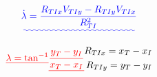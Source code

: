 \documentclass[conference]{IEEEtran}
\providecommand{\DIFadd}[1]{{\protect\color{blue}\uwave{#1}}} %
\providecommand{\DIFdel}[1]{{\protect\color{red}\sout{#1}}}                      %
\providecommand{\DIFaddbegin}{} %
\providecommand{\DIFaddend}{} %
\providecommand{\DIFdelbegin}{} %
\providecommand{\DIFdelend}{} %
\newcommand{\DIFscaledelfig}{0.5}
\newlength{\DIFdelgraphicswidth} %
\newlength{\DIFdelgraphicsheight} %
\newcommand{\DIFaddincludegraphics}[2][]{{\color{blue}\fbox{\DIFOincludegraphics[#1]{#2}}}} %
\newcommand{\DIFdelincludegraphics}[2][]{%
\sbox{\DIFdelgraphicsbox}{\DIFOincludegraphics[#1]{#2}}%
\settoboxwidth{\DIFdelgraphicswidth}{\DIFdelgraphicsbox} %
\settoboxtotalheight{\DIFdelgraphicsheight}{\DIFdelgraphicsbox} %
\scalebox{\DIFscaledelfig}{%
\parbox[b]{\DIFdelgraphicswidth}{\usebox{\DIFdelgraphicsbox}\\[-\baselineskip] \rule{\DIFdelgraphicswidth}{0em}}\llap{\resizebox{\DIFdelgraphicswidth}{\DIFdelgraphicsheight}{%
\setlength{\unitlength}{\DIFdelgraphicswidth}%
\begin{picture}(1,1)%
\thicklines\linethickness{2pt} %
{\color[rgb]{1,0,0}\put(0,0){\framebox(1,1){}}}%
{\color[rgb]{1,0,0}\put(0,0){\line( 1,1){1}}}%
{\color[rgb]{1,0,0}\put(0,1){\line(1,-1){1}}}%
\end{picture}%
}\hspace*{3pt}}} %
} %
\DeclareRobustCommand{\DIFaddbegin}{\DIFOaddbegin \let\includegraphics\DIFaddincludegraphics} %
\DeclareRobustCommand{\DIFaddend}{\DIFOaddend \let\includegraphics\DIFOincludegraphics} %
\DeclareRobustCommand{\DIFdelbegin}{\DIFOdelbegin \let\includegraphics\DIFdelincludegraphics} %
\DeclareRobustCommand{\DIFdelend}{\DIFOaddend \let\includegraphics\DIFOincludegraphics} %
\begin{document}
\DIFaddbegin \begin{equation} \DIFadd{\label{eq:losrate}
\dot{\lambda} = \frac{R_{TIx}V_{TIy}-R_{TIy}V_{TIx}}{R_{TI}^2}
}\end{equation}
\DIFaddend 

\begin{equation} \DIFdelbegin %
\DIFdel{\lambda = \tan^{-1} }%
\DIFdel{\frac{y_T - y_I}{x_T - x_I}}%
\DIFdelend \DIFaddbegin \label{eq:pos}
\begin{split}
R_{TIx} = x_T-x_I\\
R_{TIy} = y_T-y_I
\end{split}
\DIFaddend \end{equation}


%
\end{document}
